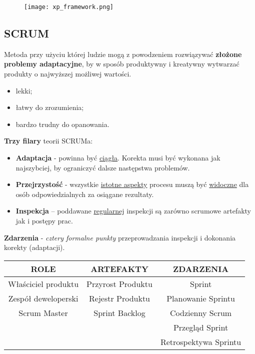 \documentclass[a4paper]{article}
\begin{document}
    \begin{figure}[H]
        \texttt{[image: xp\_framework.png]}
    \end{figure}

    \subsection{SCRUM}
    Metoda przy użyciu której ludzie mogą z powodzeniem rozwiązywać \textbf{złożone problemy
    adaptacyjne}, by w sposób produktywny i kreatywny wytwarzać produkty o najwyższej możliwej wartości.
    \begin{itemize}
        \item lekki;
        \item łatwy do zrozumienia;
        \item bardzo trudny do opanowania.
    \end{itemize}

    \textbf{Trzy filary} teorii SCRUMa:
    \begin{itemize}
        \item \textbf{Adaptacja} - powinna być \underline{ciągła}. Korekta musi być
        wykonana jak najszybciej, by ograniczyć dalsze następstwa problemów.
        \item \textbf{Przejrzystość} - wszystkie \underline{istotne aspekty} procesu
        muszą być \underline{widoczne} dla osób odpowiedzialnych za osiągane rezultaty.
        \item \textbf{Inspekcja} – poddawane \underline{regularnej} inspekcji są zarówno scrumowe
        artefakty jak i postępy prac.
    \end{itemize}


    \textbf{Zdarzenia} - \textit{cztery formalne punkty} przeprowadzania inspekcji i dokonania korekty (adaptacji).

    \begin{tabular}{|c|c|c|}
        \hline
        ROLE & ARTEFAKTY & ZDARZENIA\\
        \hline
        Właściciel produktu & Przyrost Produktu & Sprint\\
        Zespół deweloperski & Rejestr Produktu & Planowanie Sprintu\\
        Scrum Master & Sprint Backlog & Codzienny Scrum\\
        & & Przegląd Sprint\\
        & & Retrospektywa Sprintu\\
        \hline
    \end{tabular}
\end{document}
